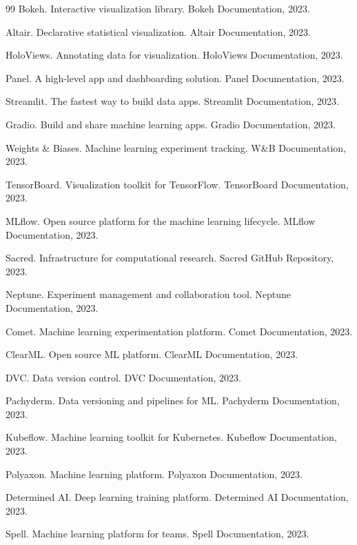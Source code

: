 \documentclass[12pt,a4paper]{ctexart}
\begin{document}
\begin{thebibliography}{99}
 Bokeh. Interactive visualization library. Bokeh Documentation, 2023.

 Altair. Declarative statistical visualization. Altair Documentation, 2023.

 HoloViews. Annotating data for visualization. HoloViews Documentation, 2023.

 Panel. A high-level app and dashboarding solution. Panel Documentation, 2023.

 Streamlit. The fastest way to build data apps. Streamlit Documentation, 2023.

 Gradio. Build and share machine learning apps. Gradio Documentation, 2023.

 Weights \& Biases. Machine learning experiment tracking. W\&B Documentation, 2023.

 TensorBoard. Visualization toolkit for TensorFlow. TensorBoard Documentation, 2023.

 MLflow. Open source platform for the machine learning lifecycle. MLflow Documentation, 2023.

 Sacred. Infrastructure for computational research. Sacred GitHub Repository, 2023.

 Neptune. Experiment management and collaboration tool. Neptune Documentation, 2023.

 Comet. Machine learning experimentation platform. Comet Documentation, 2023.

 ClearML. Open source ML platform. ClearML Documentation, 2023.

 DVC. Data version control. DVC Documentation, 2023.

 Pachyderm. Data versioning and pipelines for ML. Pachyderm Documentation, 2023.

 Kubeflow. Machine learning toolkit for Kubernetes. Kubeflow Documentation, 2023.

 Polyaxon. Machine learning platform. Polyaxon Documentation, 2023.

 Determined AI. Deep learning training platform. Determined AI Documentation, 2023.

 Spell. Machine learning platform for teams. Spell Documentation, 2023.


\end{thebibliography}
\end{document}
